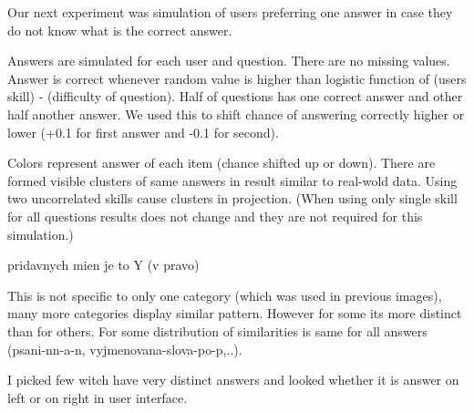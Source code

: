 \documentclass[
  digital, %
  table,   %
  nolof,     %
  nolot,     %
  nocover
]{fithesis3}
\begin{document}

Our next experiment was simulation of users preferring one answer in
case they do not know what is the correct answer.

Answers are simulated for each user and question. There are no missing
values. Answer is correct whenever random value is higher than logistic
function of (users skill) - (difficulty of question). Half of questions
has one correct answer and other half another answer. We used this to
shift chance of answering correctly higher or lower (+0.1 for first
answer and -0.1 for second).


Colors represent answer of each item (chance shifted up or down). There
are formed visible clusters of same answers in result similar to
real-wold data. Using two uncorrelated skills cause clusters in
projection. (When using only single skill for all questions results does
not change and they are not required for this simulation.)

pridavnych mien je to Y (v pravo)

This is not specific to only one category (which was used in previous
images), many more categories display similar pattern. However for some
its more distinct than for others. For some distribution of similarities
is same for all answers (psani-nn-a-n, vyjmenovana-slova-po-p,..).

I picked few witch have very distinct answers and looked whether it is
answer on left or on right in user interface.

\end{document}
